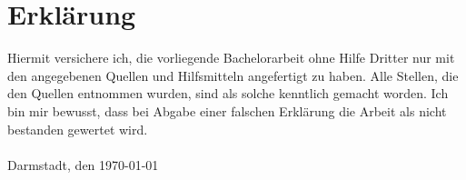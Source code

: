 \section*{Erklärung}

Hiermit versichere ich, die vorliegende Bachelorarbeit ohne Hilfe Dritter nur mit den angegebenen Quellen und Hilfsmitteln angefertigt zu haben. Alle Stellen, die den Quellen entnommen wurden, sind als solche kenntlich gemacht worden. Ich bin mir bewusst, dass bei Abgabe einer falschen Erklärung die Arbeit als nicht bestanden gewertet wird. \\ \\

Darmstadt, den \today

%
%
%



